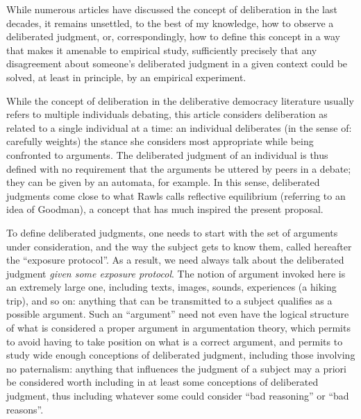 \documentclass[version=last, pagesize, twoside=off, bibliography=totoc, DIV=calc, fontsize=12pt, a4paper, french, english]{scrartcl}
\begin{document}
While numerous articles have discussed the concept of deliberation in the last decades, it remains unsettled, to the best of my knowledge, how to observe a deliberated judgment, or, correspondingly, how to define this concept in a way that makes it amenable to empirical study, sufficiently precisely that any disagreement about someone’s deliberated judgment in a given context could be solved, at least in principle, by an empirical experiment. %

While the concept of deliberation in the deliberative democracy literature usually refers to multiple individuals debating, this article considers deliberation as related to a single individual at a time: an individual deliberates (in the sense of: carefully weights) the stance she considers most appropriate while being confronted to arguments. The deliberated judgment of an individual is thus defined with no requirement that the arguments be uttered by peers in a debate; they can be given by an automata, for example. In this sense, deliberated judgments come close to what Rawls calls reflective equilibrium (referring to an idea of Goodman), a concept that has much inspired the present proposal.

To define deliberated judgments, one needs to start with the set of arguments under consideration, and the way the subject gets to know them, called hereafter the “exposure protocol”. As a result, we need always talk about the deliberated judgment \emph{given some exposure protocol}. The notion of argument invoked here is an extremely large one, including texts, images, sounds, experiences (a hiking trip), and so on: anything that can be transmitted to a subject qualifies as a possible argument. Such an “argument” need not even have the logical structure of what is considered a proper argument in argumentation theory, which permits to avoid having to take position on what is a correct argument, and permits to study wide enough conceptions of deliberated judgment, including those involving no paternalism: anything that influences the judgment of a subject may a priori be considered worth including in at least some conceptions of deliberated judgment, thus including whatever some could consider “bad reasoning” or “bad reasons”.
\end{document}
